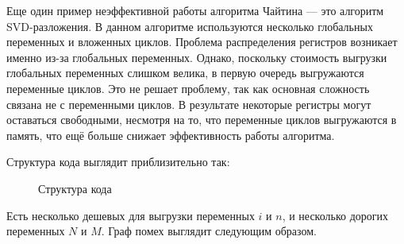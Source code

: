 \documentclass[12pt]{article}
\begin{document}
Еще один пример неэффективной работы алгоритма Чайтина — это алгоритм SVD-разложения.
В данном алгоритме используются несколько глобальных переменных и вложенных циклов.
Проблема распределения регистров возникает именно из-за глобальных переменных.  
Однако, поскольку стоимость выгрузки глобальных переменных слишком велика, в первую очередь выгружаются переменные циклов.
Это не решает проблему, так как основная сложность связана не с переменными циклов. 
В результате некоторые регистры могут оставаться свободными, несмотря на то, что переменные циклов выгружаются в память, что ещё больше снижает эффективность работы алгоритма.

Структура кода выглядит приблизительно так:

\begin{figure}[H]
    \centering
    \caption{Структура кода}
    \label{fig:structure}
\end{figure}

Есть несколько дешевых для выгрузки переменных $i$ и $n$, и несколько дорогих переменных $N$ и $M$.
Граф помех выглядит следующим образом.

\begin{figure}[H]
    \centering
\end{figure}
\end{document}
